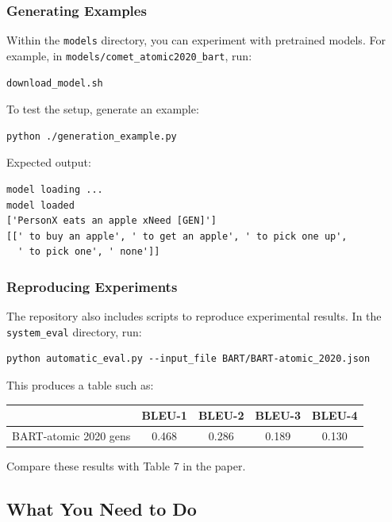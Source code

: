 \documentclass[11pt,a4paper]{article}
\begin{document}
\subsubsection*{Generating Examples}

Within the \texttt{models} directory, you can experiment with pretrained models. For example, in \texttt{models/comet\_atomic2020\_bart}, run:

\begin{verbatim}
download_model.sh
\end{verbatim}

To test the setup, generate an example:

\begin{verbatim}
python ./generation_example.py
\end{verbatim}

Expected output:

\begin{verbatim}
model loading ...
model loaded
['PersonX eats an apple xNeed [GEN]']
[[' to buy an apple', ' to get an apple', ' to pick one up',
  ' to pick one', ' none']]
\end{verbatim}

\subsubsection*{Reproducing Experiments}

The repository also includes scripts to reproduce experimental results. In the \texttt{system\_eval} directory, run:

\begin{verbatim}
python automatic_eval.py --input_file BART/BART-atomic_2020.json
\end{verbatim}

This produces a table such as:

\begin{center}
	\begin{tabular}{lcccc}
		\hline
		                      & BLEU-1 & BLEU-2 & BLEU-3 & BLEU-4 \\
		\hline
		BART-atomic 2020 gens & 0.468  & 0.286  & 0.189  & 0.130  \\
		\hline
	\end{tabular}
\end{center}

Compare these results with Table 7 in the paper.

\subsection{What You Need to Do}
\end{document}
